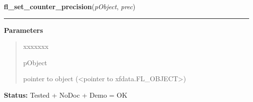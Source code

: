     \label{xformslib:library:fl_set_counter_precision}

    \vspace{0.5ex}

\hspace{.8\funcindent}\begin{boxedminipage}{\funcwidth}

    \raggedright \textbf{fl\_set\_counter\_precision}(\textit{pObject}, \textit{prec})

    \vspace{-1.5ex}

    \rule{\textwidth}{0.5\fboxrule}
\setlength{\parskip}{2ex}
\setlength{\parskip}{1ex}
      \textbf{Parameters}
      \vspace{-1ex}

      \begin{quote}
        \begin{Ventry}{xxxxxxx}

          \item[pObject]

          pointer to object ({\textless}pointer to 
          xfdata.FL\_OBJECT{\textgreater})

        \end{Ventry}

      \end{quote}

\textbf{Status:} Tested + NoDoc + Demo = OK



    \end{boxedminipage}

    \label{xformslib:library:fl_get_counter_precision}

    \vspace{0.5ex}

